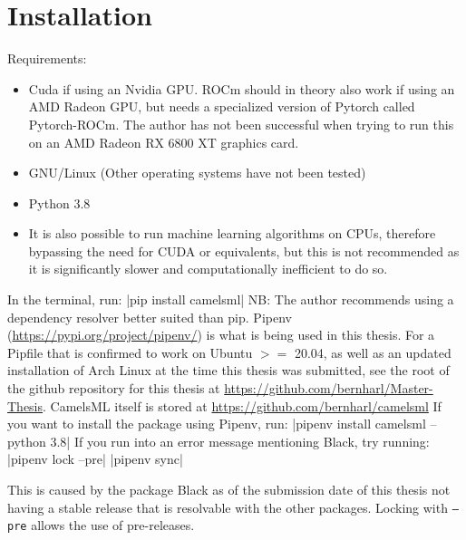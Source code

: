 \section{Installation}
\label{camelsml documentation}
Requirements:
\begin{itemize}
    \item Cuda if using an Nvidia GPU. ROCm should in theory also work if using an 
    AMD Radeon GPU, but needs a specialized version of Pytorch called Pytorch-ROCm. 
    The author has not been successful when trying to run this on an AMD Radeon 
    RX 6800 XT graphics card.
    \item GNU/Linux (Other operating systems have not been tested)
    \item Python 3.8
    \item It is also possible to run machine learning algorithms on CPUs, therefore bypassing the need for CUDA or equivalents, but this is not recommended as it is significantly slower and computationally inefficient to do so.
\end{itemize}
In the terminal, run:
|pip install camelsml|
NB: The author recommends using a dependency resolver better suited than pip. 
Pipenv (\url{https://pypi.org/project/pipenv/}) is what is being used in this thesis.
For a Pipfile that is confirmed to work on Ubuntu $>=$ 20.04, as well as an updated 
installation of Arch Linux at the time this thesis was submitted, 
see the root of the github repository for this thesis at \url{https://github.com/bernharl/Master-Thesis}.
CamelsML itself is stored at \url{https://github.com/bernharl/camelsml}
If you want to install the package using Pipenv, run:
|pipenv install camelsml --python 3.8|
If you run into an error message mentioning Black, try running:
|pipenv lock --pre|
|pipenv sync|

This is caused by the package Black as of the submission date of this thesis not 
having a stable release that is resolvable with the other packages. Locking with 
\texttt{--pre} allows the use of pre-releases.

